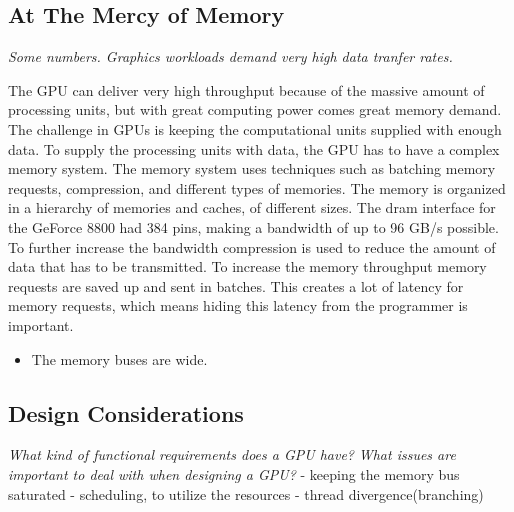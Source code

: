 \documentclass[../main/report.tex]{subfiles}
\begin{document}
\subsection{At The Mercy of Memory}


\textit{Some numbers. Graphics workloads demand very high data tranfer rates.}

The GPU can deliver very high throughput because of the massive amount of processing units, but with great computing power comes great memory demand.
The challenge in GPUs is keeping the computational units supplied with enough data.
To supply the processing units with data, the GPU has to have a complex memory system. 
The memory system uses techniques such as batching memory requests, compression, and different types of memories.
The memory is organized in a hierarchy of memories and caches, of different sizes.
The dram interface for the GeForce 8800 had 384 pins, making a bandwidth of up to 96 GB/s possible.
To further increase the bandwidth compression is used to reduce the amount of data that has to be transmitted.
To increase the memory throughput memory requests are saved up and sent in batches.
This creates a lot of latency for memory requests, which means hiding this latency from the programmer is important.
 
\begin{itemize}
	\item The memory buses are wide.
\end{itemize}


\subsection{Design Considerations}

\textit{What kind of functional requirements does a GPU have?}
\textit{What issues are important to deal with when designing a GPU?}
- keeping the memory bus saturated
- scheduling, to utilize the resources
- thread divergence(branching)
\end{document}
